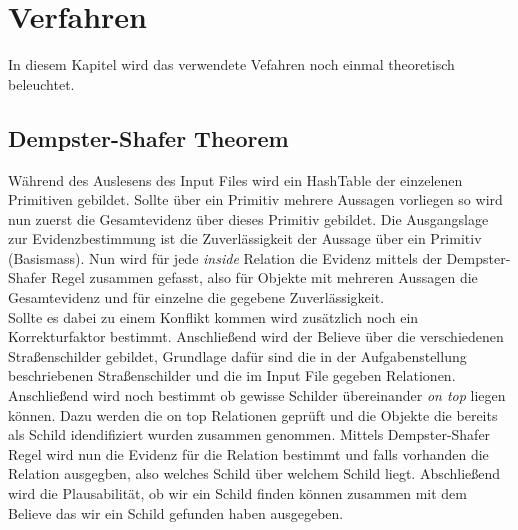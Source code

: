 \chapter{Verfahren}
In diesem Kapitel wird das verwendete Vefahren noch einmal
theoretisch beleuchtet.
\section{Dempster-Shafer Theorem}
  Während des Auslesens des Input Files wird ein HashTable
  der einzelenen Primitiven gebildet. Sollte über ein Primitiv 
  mehrere Aussagen vorliegen so wird nun zuerst die Gesamtevidenz
  über dieses Primitiv gebildet. Die Ausgangslage zur 
  Evidenzbestimmung ist die Zuverlässigkeit der Aussage über
  ein Primitiv (Basismass). Nun wird für jede \textit{inside} 
  Relation die Evidenz mittels der Dempster-Shafer Regel
  zusammen gefasst, also für Objekte mit mehreren Aussagen 
  die Gesamtevidenz und für einzelne die gegebene 
  Zuverlässigkeit.\\
  Sollte es dabei zu einem Konflikt kommen
  wird zusätzlich noch ein Korrekturfaktor bestimmt. 
  Anschließend wird der Believe über die verschiedenen
  Straßenschilder gebildet, Grundlage dafür sind die in der
  Aufgabenstellung beschriebenen Straßenschilder und die im
  Input File gegeben Relationen. \\
  Anschließend wird noch bestimmt ob gewisse Schilder übereinander
  \textit{on top} liegen können. Dazu werden die on top Relationen
  geprüft und die Objekte die bereits als Schild idendifiziert wurden
  zusammen genommen. Mittels Dempster-Shafer Regel wird nun die Evidenz
  für die Relation bestimmt und falls vorhanden die Relation ausgegben,
  also welches Schild über welchem Schild liegt.
  Abschließend wird die Plausabilität, ob wir ein Schild
  finden können zusammen mit dem Believe das wir ein Schild
  gefunden haben ausgegeben.
